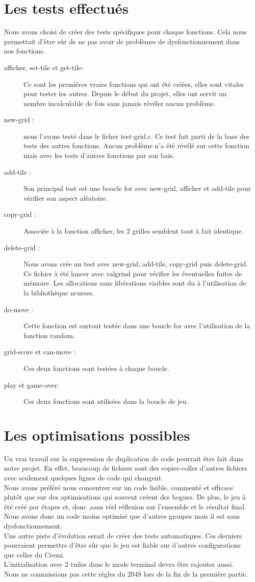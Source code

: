 \documentclass{report}
\begin{document}
\section{Les tests effectués}
Nous avons choisi de créer des tests spécifiques pour chaque fonctions. Cela nous permettait d'être sûr de ne pas avoir de problèmes de dysfonctionnement dans nos fonctions.
\begin{description}
\item [afficher, set-tile et get-tile:] Ce sont les premières vraies fonctions qui ont été créées, elles sont vitales pour tester les autres. Depuis le début du projet, elles ont servit un nombre incalculable de fois sans jamais révéler aucun problème.
\item [new-grid :] nous l'avons testé dans le ficher test-grid.c. Ce test fait parti de la base des tests des autres fonctions. Aucun problème n'a été révélé sur cette fonction mais avec les tests d'autres fonctions par son bais.
\item [add-tile :] Son principal test est une boucle for avec new-grid, afficher et add-tile pour vérifier son aspect aléatoire.
\item [copy-grid :]Associée à la fonction afficher, les 2 grilles semblent tout à fait identique.
\item [delete-grid :] Nous avons crée un test avec new-grid, add-tile, copy-grid puis delete-grid. Ce fichier à été lancer avec valgrind pour vérifier les éventuelles fuites de mémoire. Les allocations sans libérations visibles sont du à l'utilisation de la bibliothèque ncurses.
\item [do-move :] Cette fonction est surtout testée dans une boucle for avec l'utilisation de la fonction random.
\item [grid-score et can-move :] Ces deux fonctions sont testées à chaque boucle.
\item [play et game-over:]Ces deux fonctions sont utilisées dans la boucle de jeu. 
\end{description}

\section{Les optimisations possibles}
Un vrai travail sur la suppression de duplication de code pourrait être fait dans notre projet. En effet, beaucoup de fichiers sont des copier-coller d'autres fichiers avec seulement quelques lignes de code qui changent.\\ Nous avons préféré nous concentrer sur un code lisible, commenté et efficace plutôt que sur des optimisations qui souvent créent des bogues. De plus, le jeu à été créé par étapes et, donc ,sans réel réflexion sur l'ensemble et le résultat final. Nous avons donc un code moins optimisé que d'autres groupes mais il est sans dysfonctionnement.\\
Une autre piste d'évolution serait de créer des tests automatiques. Ces derniers pourraient permettre d'être sûr que le jeu est fiable sur d'autres configurations que celles du Cremi.\\
L'initialisation avec 2 tuiles dans le mode terminal devra être rajouter aussi. Nous ne connaissions pas cette règles du 2048 lors de la fin de la première partie.
\end{document}
